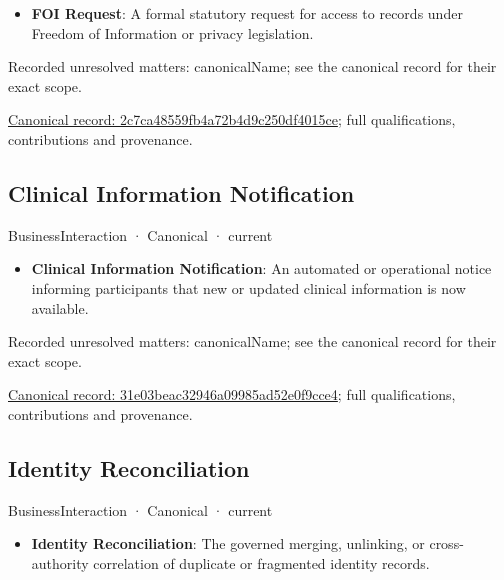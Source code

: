 \begin{itemize}


\item \textbf{FOI Request}: A formal statutory request for access to records under Freedom of Information or privacy legislation.

\end{itemize}

{\small Recorded unresolved matters: canonicalName; see the canonical record for their exact scope.}\par
{\footnotesize \href{../../../../continuum/business/business-interaction/2c7ca48559fb4a72b4d9c250df4015ce.md}{Canonical record: 2c7ca48559fb4a72b4d9c250df4015ce}; full qualifications, contributions and provenance.}\par
\subsection{Clinical Information Notification}

\label{element:31e03beac32946a09985ad52e0f9cce4}
{\small BusinessInteraction · Canonical · current}\par

\begin{itemize}


\item \textbf{Clinical Information Notification}: An automated or operational notice informing participants that new or updated clinical information is now available.

\end{itemize}

{\small Recorded unresolved matters: canonicalName; see the canonical record for their exact scope.}\par
{\footnotesize \href{../../../../continuum/business/business-interaction/31e03beac32946a09985ad52e0f9cce4.md}{Canonical record: 31e03beac32946a09985ad52e0f9cce4}; full qualifications, contributions and provenance.}\par
\subsection{Identity Reconciliation}

\label{element:332cdc30ae0346c6b86233db71caf683}
{\small BusinessInteraction · Canonical · current}\par

\begin{itemize}


\item \textbf{Identity Reconciliation}: The governed merging, unlinking, or cross-authority correlation of duplicate or fragmented identity records.

\end{itemize}

